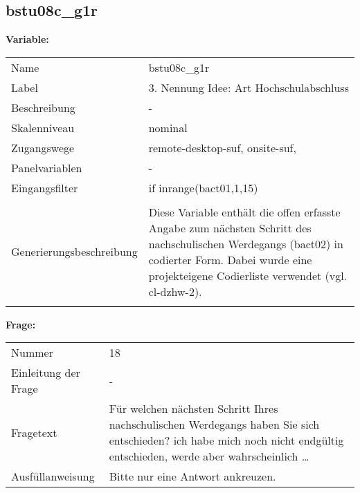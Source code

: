 	
	
	\subsection{bstu08c\_g1r}
	\label{subSection:bstu08c_g1r}

	\noindent\textbf{Variable:}\\
		\begin{tabular}{lL{11.3cm}}
			\label{tableVariable:bstu08c_g1r}
			Name & bstu08c\_g1r \\
			Label & 3. Nennung Idee: Art Hochschulabschluss \\
			Beschreibung & - \\
			Skalenniveau & nominal \\
			Zugangswege &
				remote-desktop-suf,
				onsite-suf,
 \\
			Panelvariablen & -
			 \\
			Eingangsfilter & if inrange(bact01,1,15) \\
 \\
					Generierungsbeschreibung & Diese Variable enthält die offen erfasste Angabe zum nächsten Schritt des nachschulischen Werdegangs (bact02) in codierter Form. Dabei wurde eine projekteigene Codierliste verwendet (vgl. cl-dzhw-2).
				 \\	
			 \\
		\end{tabular}

		\vspace*{1 cm}
		\noindent\textbf{Frage:}\\
		\begin{tabular}{lL{11.3cm}}
			\label{tableQuestion:bstu08c_g1r}
			Nummer & 18 \\
			Einleitung der Frage & - \\
			Fragetext & Für welchen nächsten Schritt Ihres nachschulischen Werdegangs haben Sie sich entschieden?
ich habe mich noch nicht endgültig entschieden, werde aber wahrscheinlich … \\
			Ausfüllanweisung & Bitte nur eine Antwort ankreuzen. \\
		\end{tabular}





